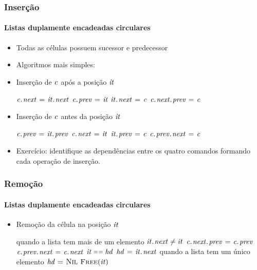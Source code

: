 \documentclass{beamer}
\begin{document}
\begin{frame}
  \frametitle{Inserção}
  \framesubtitle{Listas duplamente encadeadas circulares}

  \begin{itemize}
    \item Todas as células possuem sucessor e predecessor
    \item Algoritmos mais simples:
    \item Inserção de $\id{c}$ após a posição $\id{it}$
      \begin{codebox}
        \zi $\attrib{\id{c}}{next} \gets \attrib{\id{it}}{next}$
        \zi $\attrib{\id{c}}{prev} \gets \id{it}$
        \zi $\attrib{\id{it}}{next} \gets \id{c}$
        \zi $\attrib{\attrib{\id{c}}{next}}{prev} \gets \id{c}$
      \end{codebox}
    \item Inserção de $\id{c}$ antes da posição $\id{it}$
      \begin{codebox}
        \zi $\attrib{\id{c}}{prev} \gets \attrib{\id{it}}{prev}$
        \zi $\attrib{\id{c}}{next} \gets \id{it}$
        \zi $\attrib{\id{it}}{prev} \gets \id{c}$
        \zi $\attrib{\attrib{\id{c}}{prev}}{next} \gets \id{c}$
      \end{codebox}
      \pause
    \item Exercício: identifique as dependências entre os quatro comandos formando cada operação de inserção.
  \end{itemize}
  
\end{frame}

\begin{frame}
  \frametitle{Remoção}
  \framesubtitle{Listas duplamente encadeadas circulares}

  \begin{itemize}
    \item Remoção da célula na posição $\id{it}$
      \begin{codebox}
        \zi \Comment quando a lista tem mais de um elemento
        \zi \If $\attrib{\id{it}}{next} \neq \id{it}$
        \zi \Then 
              $\attrib{\attrib{\id{c}}{next}}{prev} \gets \attrib{\id{c}}{prev}$
        \zi   $\attrib{\attrib{\id{c}}{prev}}{next} \gets \attrib{\id{c}}{next}$
        \zi   \If $\id{it} \isequal \id{hd}$
        \zi   \Then
                $\id{hd} \gets \attrib{\id{it}}{next}$
              \End
        \zi \Comment quando a lista tem um único elemento
        \zi \Else
              $\id{hd} \gets \const{Nil}$
            \End
        \zi \textcolor{gray}{$\proc{Free}(\id{it})$}
      \end{codebox}
  \end{itemize}
  
\end{frame}
\end{document}
